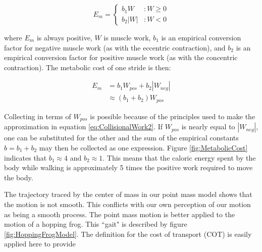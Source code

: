 \begin{displaymath}
   E_{m} = \left\{
     \begin{array}{lr}
       b_{1} W & : W \geq 0\\
       b_{2} |W| & : W < 0
     \end{array}
   \right.
\end{displaymath}

where $E_{m}$ is always positive, $W$ is muscle work, $b_{1}$ is an empirical conversion factor for negative muscle work (as with the eccentric contraction), and $b_{2}$ is an empirical conversion factor for positive muscle work (as with the concentric contraction). The metabolic cost of one stride is then:

\begin{align}
E_{m} &= b_{1} W_{pos} + b_{2} |W_{neg}| \\
&\approx (b_{1} + b_{2})W_{pos}
\end{align}

Collecting in terms of $W_{pos}$ is possible because of the principles used to make the approximation in equation \ref{eq:CollisionalWork2}. If $W_{pos}$ is nearly equal to $|W_{neg}|$, one can be substituted for the other and the sum of the empirical constants $b = b_{1} + b_{2}$ may then be collected as one expression. Figure \ref{fig:MetabolicCost} indicates that $b_{1}\approx4$ and $b_{2}\approx1$. This means that the caloric energy spent by the body while walking is approximately 5 times the positive work required to move the body. 


The trajectory traced by the center of mass in our point mass model shows that the motion is not smooth. This conflicts with our own perception of our motion as being a smooth process. The point mass motion is better applied to the motion of a hopping frog. This ``gait" is described by figure \ref{fig:HoppingFrogModel}. The definition for the cost of transport (COT) is easily applied here to provide 

